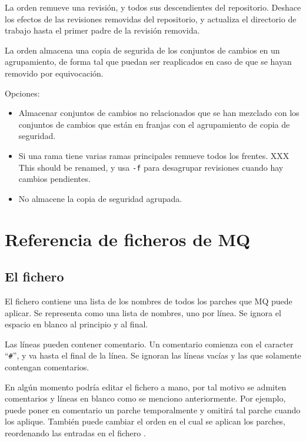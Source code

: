 La orden  remueve una revisión, y todos sus descendientes
del repositorio.  Deshace los efectos de las revisiones removidas del
repositorio, y actualiza el directorio de trabajo hasta el primer
padre de la revisión removida.

La orden  almacena una copia de segurida de los conjuntos
de cambios en un agrupamiento, de forma tal que puedan ser reaplicados
en caso de que se hayan removido por equivocación.

Opciones:
\begin{itemize}
\item[\hgopt{strip}{-b}] Almacenar conjuntos de cambios no
  relacionados que se han mezclado con los conjuntos de cambios que
  están en franjas con el agrupamiento de copia de seguridad.
\item[\hgopt{strip}{-f}] Si una rama tiene varias ramas principales
  remueve todos los frentes. XXX This should be renamed, y usa
  \texttt{-f} para desagrupar revisiones cuando hay cambios pendientes.
\item[\hgopt{strip}{-n}] No almacene la copia de seguridad agrupada.
\end{itemize}

\section{Referencia de ficheros de MQ}

\subsection{El fichero }

El fichero  contiene una lista de los nombres de
todos los parches que MQ puede aplicar.  Se representa como una lista
de nombres, uno por línea.  Se ignora el espacio en blanco al
principio y al final.

Las líneas pueden contener comentario.  Un comentario comienza con el
caracter ``\texttt{\#}'', y va hasta el final de la línea.  Se ignoran
las líneas vacías y las que solamente contengan comentarios.

En algún momento podría editar el fichero  a mano,
por tal motivo se admiten comentarios y líneas en blanco como se
menciono anteriormente.  Por ejemplo, puede poner en comentario un
parche temporalmente y  omitirá tal parche cuando
los aplique.  También puede cambiar el orden en el cual se aplican los
parches, reordenando las entradas en el fichero .

